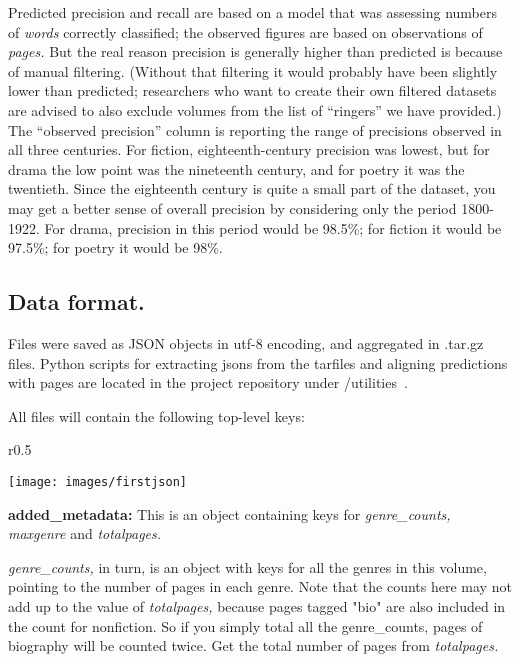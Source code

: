 \documentclass[paper=a4, fontsize=12pt]{scrartcl}
\numberwithin{equation}{section}		%
\numberwithin{figure}{section}			%
\numberwithin{table}{section}				%
\begin{document}
Predicted precision and recall are based on a model that was assessing numbers of \textit{words} correctly classified; the observed figures are based on observations of \textit{pages.} But the real reason precision is generally higher than predicted is because of manual filtering. (Without that filtering it would probably have been slightly lower than predicted; researchers who want to create their own filtered datasets are advised to also exclude volumes from the list of ``ringers'' we have provided.) The ``observed precision'' column is reporting the range of precisions observed in all three centuries. For fiction, eighteenth-century precision was lowest, but for drama the low point was the nineteenth century, and for poetry it was the twentieth. Since the eighteenth century is quite a small part of the dataset, you may get a better sense of overall precision by considering only the period 1800-1922. For drama, precision in this period would be 98.5\%; for fiction it would be 97.5\%; for poetry it would be 98\%.

\newpage
\subsection{Data format.}

Files were saved as JSON objects in utf-8 encoding, and aggregated in .tar.gz files. Python scripts for extracting jsons from the tarfiles and aligning predictions with pages are located in the project repository under /utilities~\cite{underwood:genrerepo}.

\vspace{2mm}
\noindent All files will contain the following top-level keys:

\begin{wrapfigure}[19]{r}{0.5\textwidth}
  \begin{centering}
    \texttt{[image: images/firstjson]}
  \end{centering}
\end{wrapfigure}

\vspace{2mm}
\noindent \textbf{added\_metadata:} This is an object containing keys for \textit{genre\_counts, maxgenre} and \textit{totalpages.}

\textit{genre\_counts,} in turn, is an object with keys for all the genres in this volume, pointing to the number of pages in each genre. Note that the counts here may not add up to the value of \textit{totalpages,} because pages tagged "bio" are also included in the count for nonfiction. So if you simply total all the genre\_counts, pages of biography will be counted twice. Get the total number of pages from \textit{totalpages.}
\end{document}
